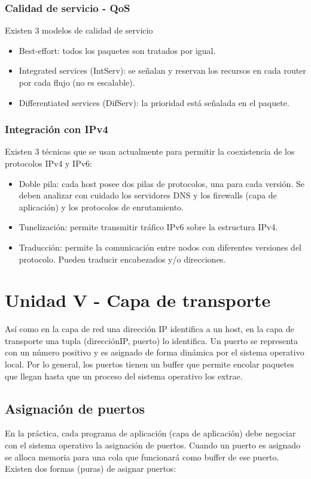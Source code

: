\documentclass{book}
\begin{document}
	\subsection{Calidad de servicio - QoS}
	Existen 3 modelos de calidad de servicio
	\begin{itemize}
		\item Best-effort: todos los paquetes son tratados por igual.
		\item Integrated services (IntServ): se señalan y reservan los recursos en cada router por cada flujo (no es escalable).
		\item Differentiated services (DifServ): la prioridad está señalada en el paquete.
	\end{itemize}
	
	\subsection{Integración con IPv4}
	Existen 3 técnicas que se usan actualmente para permitir la coexistencia de los protocolos IPv4 y IPv6:
	
	\begin{itemize}
		\item Doble pila: cada host posee dos pilas de protocolos, una para cada versión. Se deben analizar con cuidado los servidores DNS y los firewalls (capa de aplicación) y los protocolos de enrutamiento.
		\item Tunelización: permite transmitir tráfico IPv6 sobre la estructura IPv4.
		\item Traducción: permite la comunicación entre nodos con diferentes versiones del protocolo. Pueden traducir encabezados y/o direcciones.
	\end{itemize}
	
	\chapter{Unidad V - Capa de transporte}
	
	Así como en la capa de red una dirección IP identifica a un host, en la capa de transporte una tupla (direcciónIP, puerto) lo identifica. Un puerto se representa con un número positivo y es asignado de forma dinámica por el sistema operativo local. Por lo general, los puertos tienen un buffer que permite encolar paquetes que llegan hasta que un proceso del sistema operativo los extrae.
	
	\section{Asignación de puertos}
	En la práctica, cada programa de aplicación (capa de aplicación) debe negociar con el sistema operativo la asignación de puertos. Cuando un puerto es asignado se alloca memoria para una cola que funcionará como buffer de ese puerto. Existen dos formas (puras) de asignar puertos:
	
\end{document}
